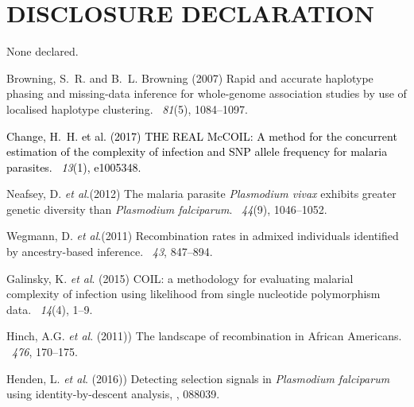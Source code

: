 \documentclass{article}
\begin{document}
\section{DISCLOSURE DECLARATION}
None declared.


\begin{thebibliography}{}

Browning, S.~R. and B.~L. Browning (2007)
\newblock Rapid and accurate haplotype phasing and missing-data inference for
  whole-genome association studies by use of localised haplotype clustering.
~{\em 81\/}(5), 1084--1097.

\textcolor{black}{Change, H.~H. et al. (2017)
\newblock THE REAL McCOIL: A method for the concurrent estimation of the complexity of infection and SNP allele frequency for malaria parasites.
~{\em 13\/}(1), e1005348.}


Neafsey, D. {\em et al}.(2012)
\newblock The malaria parasite {\it Plasmodium vivax} exhibits greater genetic diversity than {\it Plasmodium falciparum}.
~{\em 44\/}(9), 1046--1052.

Wegmann, D. {\em et al}.(2011)
\newblock Recombination rates in admixed individuals identified by ancestry-based inference.
~{\em 43\/}, 847--894.

Galinsky, K. {\em et al}. (2015)
\newblock COIL: a methodology for evaluating malarial complexity of infection using likelihood from single nucleotide polymorphism data.
~{\em14\/}(4), 1--9.

Hinch, A.G. {\em et al}. (2011))
\newblock The landscape of recombination in African Americans.
~{\em 476}, 170--175.

Henden, L. {\em et al}. (2016))
\newblock Detecting selection signals in {\it Plasmodium falciparum} using identity-by-descent analysis,
, 088039.



\end{thebibliography}
\end{document}
